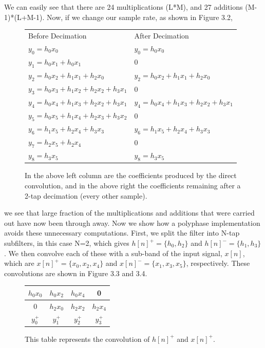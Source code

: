 \documentclass{report}
\begin{document}
We can easily see that there are 24 multiplications (L*M), and 27 additions (M-1)*(L+M-1).  Now, if we change our sample rate, as shown in Figure 3.2, 

\begin{figure}[ht]
\begin{center}
  \begin{tabular}{ l|l }
    \hline
    Before Decimation & After Decimation\\ \Xhline{1pt}
	$y_0 = h_0 x_0$ & $y_0 = h_0 x_0$\\ \hline
	$y_1 = h_0 x_1 + h_0 x_1$ & 0\\ \hline 
	$y_2 = h_0 x_2 + h_1 x_1 + h_2 x_0$ & $y_2 = h_0 x_2 + h_1 x_1 + h_2 x_0$\\ \hline 
	$y_3 = h_0 x_3 + h_1 x_2+ h_2 x_2 + h_3 x_1$ & 0 \\ \hline 
	$y_4 = h_0 x_4 + h_1 x_3+ h_2 x_2 + h_3 x_1$ & $y_4 = h_0 x_4 + h_1 x_3+ h_2 x_2 +     	h_3 x_1$\\ \hline
	$y_5 = h_0 x_5 + h_1 x_4 + h_2 x_3 + h_3 x_2$ & 0\\ \hline
	$y_6 = h_1 x_5 + h_2 x_4 + h_3 x_3$ & $y_6 = h_1 x_5 + h_2 x_4 + h_3 x_3$\\ \hline
	$y_7 = h_2 x_5 + h_2 x_4$ & 0\\ \hline
	$y_8 = h_3 x_5$ & $y_8 = h_3 x_5$\\ \hline
  \end{tabular}
\end{center}
\caption{In the above left column are the coefficients produced by the direct convolution, and in the above right the coefficients remaining after a 2-tap decimation (every other sample).}
\end{figure}

we see that large fraction of the multiplications and additions that were carried out have now been through away.  Now we show how a polyphase implementation avoids these unnecessary computations.  First, we split the filter into N-tap subfilters, in this case N=2, which gives $h[n]^+ = \{h_0, h_2\}$ and $h[n]^- = \{h_1, h_3\}$.  We then convolve each of these with a sub-band of the input signal, $x[n]$, which are $x[n]^+ = \{x_0, x_2, x_4\}$ and $x[n]^- = \{x_1, x_3, x_5\}$, respectively.  These convolutions are shown in Figure 3.3 and 3.4.

\smallskip
\begin{figure}[ht]
\begin{center}
  \begin{tabular}{ c|c|c|c }
	\hline
	$h_0 x_0$ & $h_0 x_2$ &$h_0 x_4$&0\\ \hline
	0 & $h_2 x_0$ & $h_2 x_2$ &$h_2 x_4$\\ \Xhline{1pt}
	$y^+_0$ & $y^+_1$ & $y^+_2$ & $y^+_3$\\ \hline
  \end{tabular}
\end{center}
\caption{This table represents the convolution of $h[n]^+$ and $x[n]^+$.}
\end{figure}
\end{document}
